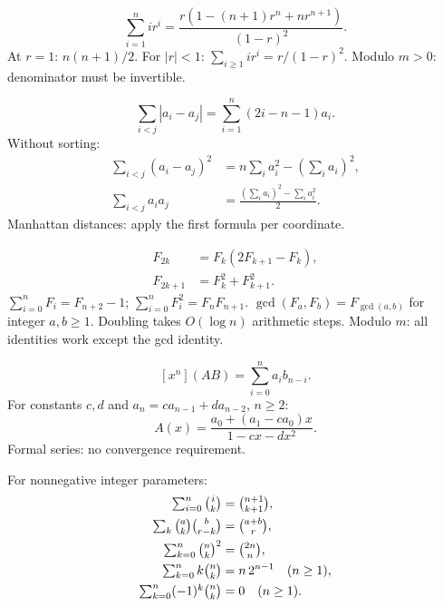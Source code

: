 
\[
 \sum_{i=1}^n ir^i
 =\frac{r(1-(n+1)r^n+nr^{n+1})}{(1-r)^2}.
\]
At $r=1$: $n(n+1)/2$.
For $|r|<1$: $\sum_{i\ge1}ir^i=r/(1-r)^2$.
Modulo $m>0$: denominator must be invertible.

\[
 \sum_{i<j}|a_i-a_j|=\sum_{i=1}^n(2i-n-1)a_i.
\]
Without sorting:
\[
 \begin{aligned}
 \sum_{i<j}(a_i-a_j)^2
   &=n\sum_i a_i^2-\left(\sum_i a_i\right)^2,\\
 \sum_{i<j}a_i a_j
   &=\frac{(\sum_i a_i)^2-\sum_i a_i^2}{2}.
 \end{aligned}
\]
Manhattan distances: apply the first formula per coordinate.

\[
 \begin{aligned}
 F_{2k}&=F_k(2F_{k+1}-F_k),\\
 F_{2k+1}&=F_k^2+F_{k+1}^2.
 \end{aligned}
\]
$\sum_{i=0}^nF_i=F_{n+2}-1$;
$\sum_{i=0}^nF_i^2=F_nF_{n+1}$.
$\gcd(F_a,F_b)=F_{\gcd(a,b)}$ for integer $a,b\ge1$.
Doubling takes $O(\log n)$ arithmetic steps. Modulo $m$:
all identities work except the gcd identity.

\[
 [x^n](AB)=\sum_{i=0}^n a_i b_{n-i}.
\]
For constants $c,d$ and $a_n=ca_{n-1}+da_{n-2}$, $n\ge2$:
\[
 A(x)=\frac{a_0+(a_1-ca_0)x}{1-cx-dx^2}.
\]
Formal series: no convergence requirement.


For nonnegative integer parameters:
\[
 \begin{aligned}
 \textstyle\sum_{i=0}^n\tbinom ik&=\tbinom{n+1}{k+1},\\
 \textstyle\sum_k\tbinom ak\tbinom b{r-k}&=\tbinom{a+b}r,\\
 \textstyle\sum_{k=0}^n\tbinom nk^2&=\tbinom{2n}n,\\
 \textstyle\sum_{k=0}^n k\tbinom nk&=n\,2^{n-1}\quad(n\ge1),\\
 \textstyle\sum_{k=0}^n(-1)^k\tbinom nk&=0\quad(n\ge1).
 \end{aligned}
\]

